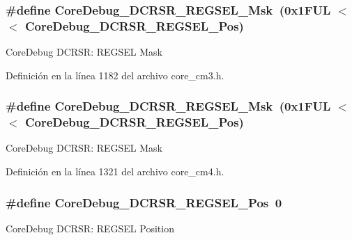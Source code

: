 \subsubsection[{\texorpdfstring{Core\+Debug\+\_\+\+D\+C\+R\+S\+R\+\_\+\+R\+E\+G\+S\+E\+L\+\_\+\+Msk}{CoreDebug_DCRSR_REGSEL_Msk}}]{\setlength{\rightskip}{0pt plus 5cm}\#define Core\+Debug\+\_\+\+D\+C\+R\+S\+R\+\_\+\+R\+E\+G\+S\+E\+L\+\_\+\+Msk~(0x1\+F\+U\+L $<$$<$ Core\+Debug\+\_\+\+D\+C\+R\+S\+R\+\_\+\+R\+E\+G\+S\+E\+L\+\_\+\+Pos)}\hypertarget{group___c_m_s_i_s___core_debug_ga17cafbd72b55030219ce5609baa7c01d}{}\label{group___c_m_s_i_s___core_debug_ga17cafbd72b55030219ce5609baa7c01d}
Core\+Debug D\+C\+R\+SR\+: R\+E\+G\+S\+EL Mask 

Definición en la línea 1182 del archivo core\+\_\+cm3.\+h.

\subsubsection[{\texorpdfstring{Core\+Debug\+\_\+\+D\+C\+R\+S\+R\+\_\+\+R\+E\+G\+S\+E\+L\+\_\+\+Msk}{CoreDebug_DCRSR_REGSEL_Msk}}]{\setlength{\rightskip}{0pt plus 5cm}\#define Core\+Debug\+\_\+\+D\+C\+R\+S\+R\+\_\+\+R\+E\+G\+S\+E\+L\+\_\+\+Msk~(0x1\+F\+U\+L $<$$<$ Core\+Debug\+\_\+\+D\+C\+R\+S\+R\+\_\+\+R\+E\+G\+S\+E\+L\+\_\+\+Pos)}\hypertarget{group___c_m_s_i_s___core_debug_ga17cafbd72b55030219ce5609baa7c01d}{}\label{group___c_m_s_i_s___core_debug_ga17cafbd72b55030219ce5609baa7c01d}
Core\+Debug D\+C\+R\+SR\+: R\+E\+G\+S\+EL Mask 

Definición en la línea 1321 del archivo core\+\_\+cm4.\+h.

\subsubsection[{\texorpdfstring{Core\+Debug\+\_\+\+D\+C\+R\+S\+R\+\_\+\+R\+E\+G\+S\+E\+L\+\_\+\+Pos}{CoreDebug_DCRSR_REGSEL_Pos}}]{\setlength{\rightskip}{0pt plus 5cm}\#define Core\+Debug\+\_\+\+D\+C\+R\+S\+R\+\_\+\+R\+E\+G\+S\+E\+L\+\_\+\+Pos~0}\hypertarget{group___c_m_s_i_s___core_debug_ga52182c8a9f63a52470244c0bc2064f7b}{}\label{group___c_m_s_i_s___core_debug_ga52182c8a9f63a52470244c0bc2064f7b}
Core\+Debug D\+C\+R\+SR\+: R\+E\+G\+S\+EL Position 

